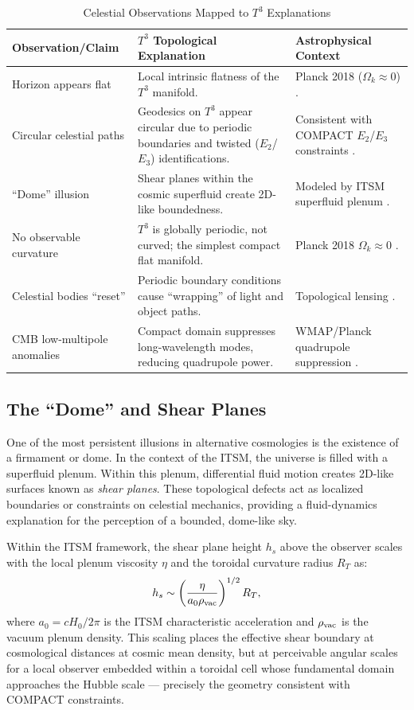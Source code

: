\documentclass[aps,prd,11pt,onecolumn,superscriptaddress,nofootinbib,floatfix]{revtex4-2}
\begin{document}
\begin{table}[h]
\centering
\caption{Celestial Observations Mapped to $T^3$ Explanations}
\label{tab:mapping}
\begin{tabular}{p{} p{} p{}}
\toprule
\textbf{Observation/Claim} & \textbf{$T^3$ Topological Explanation} & \textbf{Astrophysical Context} \\
\midrule
Horizon appears flat & Local intrinsic flatness of the $T^3$ manifold. & Planck 2018 ($\Omega_k \approx 0$) \cite{planck_2018}. \\
Circular celestial paths & Geodesics on $T^3$ appear circular due to periodic boundaries and twisted ($E_2$/$E_3$) identifications. & Consistent with COMPACT $E_2$/$E_3$ constraints \cite{compact_promise}. \\
``Dome'' illusion & Shear planes within the cosmic superfluid create 2D-like boundedness. & Modeled by ITSM superfluid plenum \cite{itsm_main}. \\
No observable curvature & $T^3$ is globally periodic, not curved; the simplest compact flat manifold. & Planck 2018 $\Omega_k \approx 0$ \cite{planck_2018}. \\
Celestial bodies ``reset'' & Periodic boundary conditions cause ``wrapping'' of light and object paths. & Topological lensing \cite{compact_pt1}. \\
CMB low-multipole anomalies & Compact domain suppresses long-wavelength modes, reducing quadrupole power. & WMAP/Planck quadrupole suppression \cite{compact_eigenmodes, fornal_2026}. \\
\bottomrule
\end{tabular}
\end{table}

\subsection{The ``Dome'' and Shear Planes}
One of the most persistent illusions in alternative cosmologies is the existence of a firmament or dome. In the context of the ITSM, the universe is filled with a superfluid plenum. Within this plenum, differential fluid motion creates 2D-like surfaces known as \textit{shear planes}. These topological defects act as localized boundaries or constraints on celestial mechanics, providing a fluid-dynamics explanation for the perception of a bounded, dome-like sky.

Within the ITSM framework, the shear plane height $h_s$ above the observer scales with the local plenum viscosity $\eta$ and the toroidal curvature radius $R_T$ as:
\begin{equation}
h_s \sim \left(\frac{\eta}{a_0 \rho_{\rm vac}}\right)^{1/2} R_T,
\end{equation}
where $a_0 = cH_0/2\pi$ is the ITSM characteristic acceleration and $\rho_{\rm vac}$ is the vacuum plenum density. This scaling places the effective shear boundary at cosmological distances at cosmic mean density, but at perceivable angular scales for a local observer embedded within a toroidal cell whose fundamental domain approaches the Hubble scale --- precisely the geometry consistent with COMPACT constraints.
\end{document}
